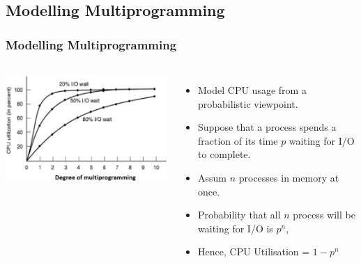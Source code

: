 \documentclass{beamer}
\begin{document}
\subsection{Modelling Multiprogramming}
\begin{frame}
\frametitle{Modelling Multiprogramming}
\begin{columns}[c]
\includegraphics[scale=0.35]{util.png}
\begin{itemize}
\item Model CPU usage from a probabilistic viewpoint.
\item Suppose that a process spends a fraction of its time $p$ waiting for I/O to complete.
\item Assum $n$ processes in memory at once.
\item Probability that all $n$ process will be waiting for I/O is $p^n$,
\item Hence, CPU Utilisation = $1-p^n$
\end{itemize}
\end{columns}
\end{frame}
\end{document}
